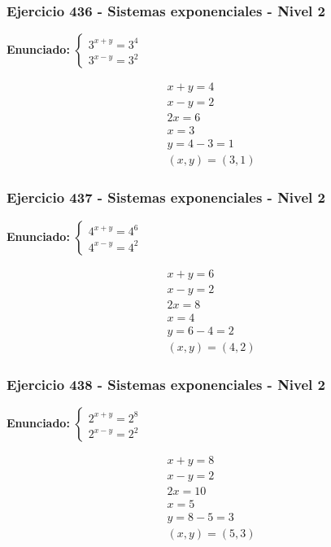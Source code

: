 \documentclass[12pt,a4paper]{article}
\begin{document}
\subsubsection*{Ejercicio 436 - Sistemas exponenciales - Nivel 2}
\textbf{Enunciado:} \(\begin{cases} 3^{x+y}=3^{4}\\ 3^{x-y}=3^{2}\end{cases}\)

\[
\begin{aligned}
x+y=4\\
x-y=2\\
2x=6\\
x=3\\
y=4-3=1\\
\boxed{(x,y)=(3,1)}
\end{aligned}
\]


\subsubsection*{Ejercicio 437 - Sistemas exponenciales - Nivel 2}
\textbf{Enunciado:} \(\begin{cases} 4^{x+y}=4^{6}\\ 4^{x-y}=4^{2}\end{cases}\)

\[
\begin{aligned}
x+y=6\\
x-y=2\\
2x=8\\
x=4\\
y=6-4=2\\
\boxed{(x,y)=(4,2)}
\end{aligned}
\]


\subsubsection*{Ejercicio 438 - Sistemas exponenciales - Nivel 2}
\textbf{Enunciado:} \(\begin{cases} 2^{x+y}=2^{8}\\ 2^{x-y}=2^{2}\end{cases}\)

\[
\begin{aligned}
x+y=8\\
x-y=2\\
2x=10\\
x=5\\
y=8-5=3\\
\boxed{(x,y)=(5,3)}
\end{aligned}
\]
\end{document}
